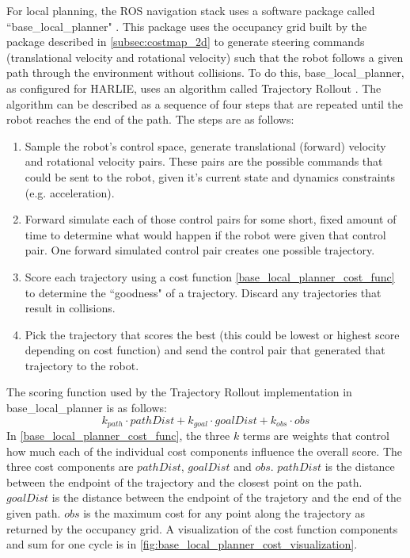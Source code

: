 For local planning, the ROS navigation stack uses a software package called ``base\_local\_planner" . This package uses the occupancy grid built by the package described in \autoref{subsec:costmap_2d} to generate steering commands (translational velocity and rotational velocity) such that the robot follows a given path through the environment without collisions. To do this, base\_local\_planner, as configured for HARLIE, uses an algorithm called Trajectory Rollout \autocite{Gerkey_Konolige_2008}. The algorithm can be described as a sequence of four steps that are repeated until the robot reaches the end of the path. The steps are as follows:
\begin{enumerate}
\item Sample the robot's control space, generate translational (forward) velocity and rotational velocity pairs. These pairs are the possible commands that could be sent to the robot, given it's current state and dynamics constraints (e.g. acceleration).
\item Forward simulate each of those control pairs for some short, fixed amount of time to determine what would happen if the robot were given that control pair. One forward simulated control pair creates one possible trajectory.
\item Score each trajectory using a cost function \eqref{base_local_planner_cost_func} to determine the ``goodness" of a trajectory. Discard any trajectories that result in collisions.
\item Pick the trajectory that scores the best (this could be lowest or highest score depending on cost function) and send the control pair that generated that trajectory to the robot.
\end{enumerate}

The scoring function used by the Trajectory Rollout implementation in base\_local\_planner is as follows:
\begin{equation}
	k_{path} \cdot pathDist + k_{goal} \cdot goalDist + k_{obs} \cdot obs \label{base_local_planner_cost_func}
\end{equation}
In \eqref{base_local_planner_cost_func}, the three $k$ terms are weights that control how much each of the individual cost components influence the overall score. The three cost components are $pathDist$, $goalDist$ and $obs$. $pathDist$ is the distance between the endpoint of the trajectory and the closest point on the path. $goalDist$ is the distance between the endpoint of the trajetory and the end of the given path. $obs$ is the maximum cost for any point along the trajectory as returned by the occupancy grid. A visualization of the cost function components and sum for one cycle is in \autoref{fig:base_local_planner_cost_visualization}.

